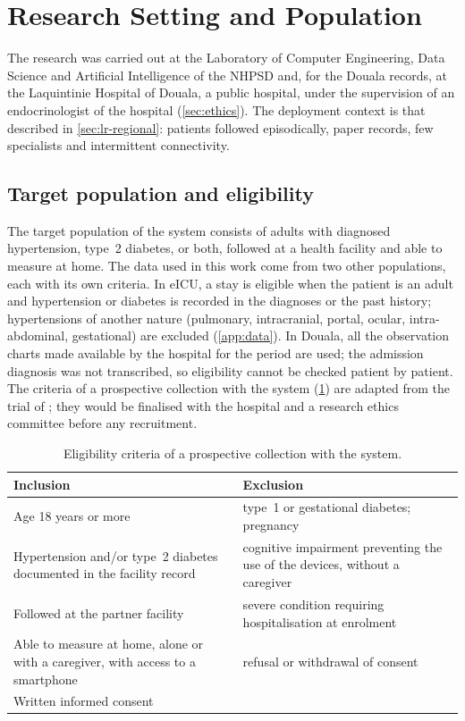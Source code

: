 \documentclass[11pt,a4paper,oneside]{report}
\begin{document}
\section{Research Setting and Population}\label{sec:setting}

The research was carried out at the Laboratory of Computer Engineering, Data Science and Artificial Intelligence of the NHPSD and, for the Douala records, at the Laquintinie Hospital of Douala, a public hospital, under the supervision of an endocrinologist of the hospital (\cref{sec:ethics}). The deployment context is that described in \cref{sec:lr-regional}: patients followed episodically, paper records, few specialists and intermittent connectivity.

\subsection{Target population and eligibility}\label{sec:eligibility}

The target population of the system consists of adults with diagnosed hypertension, type~2 diabetes, or both, followed at a health facility and able to measure at home. The data used in this work come from two other populations, each with its own criteria. In eICU, a stay is eligible when the patient is an adult and hypertension or diabetes is recorded in the diagnoses or the past history; hypertensions of another nature (pulmonary, intracranial, portal, ocular, intra-abdominal, gestational) are excluded (\cref{app:data}). In Douala, all the observation charts made available by the hospital for the period are used; the admission diagnosis was not transcribed, so eligibility cannot be checked patient by patient. The criteria of a prospective collection with the system (\cref{tab:eligibility}) are adapted from the trial of \textcite{mihevc2025}; they would be finalised with the hospital and a research ethics committee before any recruitment.

\begin{table}[htbp]
\centering\small
\caption{Eligibility criteria of a prospective collection with the system.}\label{tab:eligibility}
\begin{tabularx}{\textwidth}{@{}X X@{}}
\toprule
\textbf{Inclusion} & \textbf{Exclusion} \\
\midrule
Age 18 years or more & type~1 or gestational diabetes; pregnancy \\
Hypertension and/or type~2 diabetes documented in the facility record & cognitive impairment preventing the use of the devices, without a caregiver \\
Followed at the partner facility & severe condition requiring hospitalisation at enrolment \\
Able to measure at home, alone or with a caregiver, with access to a smartphone & refusal or withdrawal of consent \\
Written informed consent & \\
\bottomrule
\end{tabularx}
\end{table}
\end{document}
